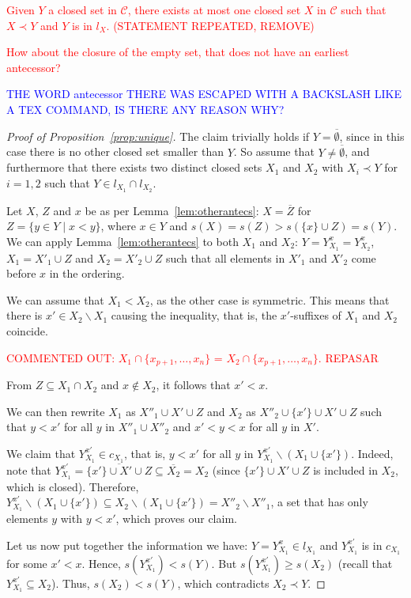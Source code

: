 \documentclass{article}
\newcommand{\added}[1]{\textcolor{blue}{#1}}
\newcommand{\deleted}[1]{\textcolor{red}{#1}}
\def\C{\mathcal{C}}
\def\s{\mathit{s}}
\newcommand{\cl}[1]{\overline{#1}}
\def\bef{\prec}
\begin{document}
\deleted{Given $Y$ a closed set in $\C$, there exists at most one closed set $X$ in $\C$ such that $X \bef Y$ and $Y$ is in $l_X$. (STATEMENT REPEATED, REMOVE)}

\deleted{How about the closure of the empty set, that does not have
an earliest antecessor?}

\added{THE WORD antecessor THERE WAS ESCAPED WITH A BACKSLASH
LIKE A TEX COMMAND, IS THERE ANY REASON WHY?}


\begin{proof}[Proof of Proposition~\ref{prop:unique}] The claim trivially holds if $Y=\cl{\emptyset}$, since in this case there is no other closed set smaller than $Y$. So assume that $Y \neq \cl{\emptyset}$, and furthermore that there exists two distinct closed sets $X_1$ and $X_2$ with $X_i \bef Y$ for $i=1,2$ such that $Y \in l_{X_1} \cap l_{X_2}$.

Let $X$, $Z$ and $x$ be as per Lemma~\ref{lem:otherantecs}:
$X=\cl{Z}$ for $Z = \{ y \in Y \mid x < y \}$, where
$x \in Y$ and $s(X) = s(Z) > s(\{x\}\cup Z) = s(Y)$.
We can apply Lemma~\ref{lem:otherantecs} to both $X_1$ and $X_2$: $Y=Y^x_{X_1}=Y^x_{X_2}$, 
$X_1=X'_1 \cup Z$ and $X_2=X'_2 \cup Z$ such that all elements in $X'_1$ and $X'_2$ come
before $x$ in the ordering. 

We can assume that $X_1 < X_2$, as the other case is symmetric. 
This means that there is $x' \in X_2 \backslash X_1$ causing
the inequality, that is, the $x'$-suffixes of $X_1$ and $X_2$ coincide.


\deleted{COMMENTED OUT: $X_1 \cap \{x_{p+1},\ldots,x_n\}$ = $X_2 \cap \{x_{p+1},\ldots,x_n\}$. REPASAR}


From $Z \subseteq X_1 \cap X_2$ and $x \notin X_2$,
it follows that $x' < x$.

We can then rewrite $X_1$ as $X''_1 \cup X' \cup Z$ and $X_2$ as $X''_2 \cup \{x'\} \cup X' \cup Z$ such that $y<x'$ for all $y$ in  $X''_1 \cup X''_2$ and $x'<y<x$ for all $y$ in $X'$.

We claim that $Y^{x'}_{X_1} \in c_{X_1}$, that is, $y < x'$ for all $y$ in $Y^{x'}_{X_1} \backslash (X_1 \cup \{x'\})$. Indeed, note that  $Y^{x'}_{X_1}=\cl{\{x'\} \cup X'\cup  Z} \subseteq \cl{X_2} = X_2$ (since $\{x'\}\cup X' \cup Z$ is included in $X_2$, which is closed). 
Therefore, $Y^{x'}_{X_1} \backslash (X_1 \cup \{x'\}) \subseteq X_2 \backslash (X_1 \cup \{x'\}) = X''_2 \backslash X''_1$, a set that has only elements $y$ with $y<x'$, which proves our claim.

Let us now put together the information we have: 
$Y =Y^{x}_{X_1}\in l_{X_1}$ and $Y^{x'}_{X_1}$ is in $c_{X_1}$ for some $x'<x$. Hence, $\s(Y^{x'}_{X_1}) < \s(Y)$. But $\s(Y^{x'}_{X_1}) \geq \s(X_2)$ (recall that $Y^{x'}_{X_1} \subseteq X_2$). Thus, $\s(X_2)<\s(Y)$, which contradicts $X_2 \bef Y$.
\end{proof}
\end{document}
